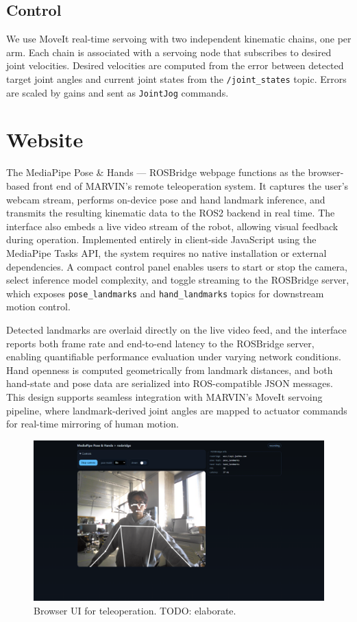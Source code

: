 \documentclass[sigconf]{acmart}
\begin{document}
\subsection{Control}
We use MoveIt real-time servoing with two independent kinematic chains, one per arm. Each chain is associated with a servoing node that subscribes to desired joint velocities. Desired velocities are computed from the error between detected target joint angles and current joint states from the \texttt{/joint\_states} topic. Errors are scaled by gains and sent as \texttt{JointJog} commands.

\section{Website}
The MediaPipe Pose \& Hands — ROSBridge webpage functions as the browser-based front end of MARVIN’s remote teleoperation system. It captures the user’s webcam stream, performs on-device pose and hand landmark inference, and transmits the resulting kinematic data to the ROS2 backend in real time. The interface also embeds a live video stream of the robot, allowing visual feedback during operation. Implemented entirely in client-side JavaScript using the MediaPipe Tasks API, the system requires no native installation or external dependencies. A compact control panel enables users to start or stop the camera, select inference model complexity, and toggle streaming to the ROSBridge server, which exposes \texttt{pose\_landmarks} and \texttt{hand\_landmarks} topics for downstream motion control.

Detected landmarks are overlaid directly on the live video feed, and the interface reports both frame rate and end-to-end latency to the ROSBridge server, enabling quantifiable performance evaluation under varying network conditions. Hand openness is computed geometrically from landmark distances, and both hand-state and pose data are serialized into ROS-compatible JSON messages. This design supports seamless integration with MARVIN’s MoveIt servoing pipeline, where landmark-derived joint angles are mapped to actuator commands for real-time mirroring of human motion.

\begin{figure}[htbp]
  \centering
  \includegraphics[width=\linewidth]{assets/web-ui}
  \caption{Browser UI for teleoperation. TODO: elaborate.}
  \label{fig:ui}
\end{figure}
\end{document}
